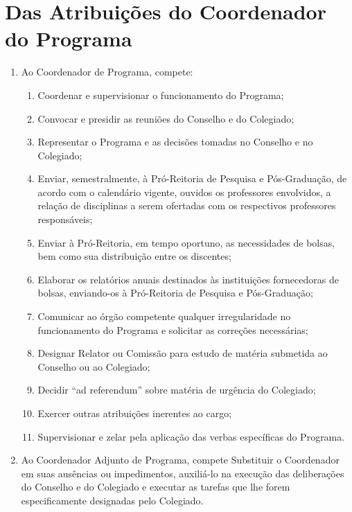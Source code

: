 \documentclass{article}
\newcommand{\grupoMenor}{Colegiado\xspace}
\newcommand{\grupoMaior}{Conselho\xspace}
\begin{document}
\section{Das Atribuições do Coordenador do Programa}
\begin{enumerate}
	\item Ao Coordenador de Programa, compete:
	\begin{enumerate}[label=\Roman*]
		\item Coordenar e supervisionar o funcionamento do Programa;
		\item Convocar e presidir as reuniões do \grupoMaior e do \grupoMenor;
		\item Representar o Programa e as decisões tomadas no \grupoMaior e no \grupoMenor;
		\item Enviar, semestralmente, à Pró-Reitoria de Pesquisa e Pós-Graduação, de acordo com o calendário vigente, ouvidos os professores envolvidos, a relação de disciplinas a serem ofertadas com os respectivos professores responsáveis;
		\item Enviar à Pró-Reitoria, em tempo oportuno, as necessidades de bolsas, bem como sua distribuição entre os discentes;
		\item Elaborar os relatórios anuais destinados às instituições fornecedoras de bolsas, enviando-os à Pró-Reitoria de Pesquisa e Pós-Graduação;
		\item Comunicar ao órgão competente qualquer irregularidade no funcionamento do Programa e solicitar as correções necessárias;
		\item Designar Relator ou Comissão para estudo de matéria submetida ao \grupoMaior ou ao \grupoMenor;
		\item Decidir ``ad referendum'' sobre matéria de urgência do \grupoMenor;
		\item Exercer outras atribuições inerentes ao cargo;
		\item Supervisionar e zelar pela aplicação das verbas específicas do Programa.
	\end{enumerate}
	\item Ao Coordenador Adjunto de Programa, compete Substituir o Coordenador em suas ausências ou impedimentos, auxiliá-lo na execução das deliberações do \grupoMaior e do \grupoMenor e executar as tarefas que lhe forem especificamente designadas pelo \grupoMenor.
\end{enumerate}
\end{document}
